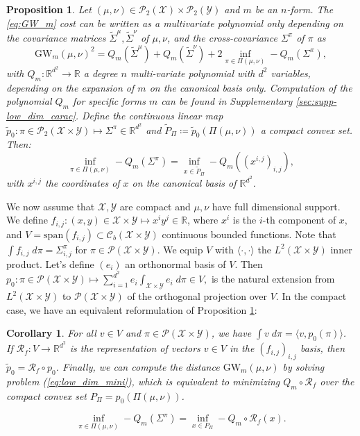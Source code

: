 \documentclass{article}
\newcommand{\R}{\mathbb{R}}
\newcommand{\Y}{\mathcal{Y}}
\newcommand{\X}{\mathcal{X}}
\newcommand{\1}{\mathbf{1}}
\newcommand{\GW}{\mathrm{GW}}
\renewcommand{\P}{\mathcal{P}}
\newtheorem{corollary}{Corollary}
\newtheorem{proposition}{Proposition}
\theoremstyle{definition}
\theoremstyle{remark}
\begin{document}
\begin{proposition}\label{proposition:GWm_problem} 
Let $(\mu,\nu)\in\P_2(\X)\times\P_2(\Y)$ and $m$ be an $n$-form. The \ref{eq:GW_m} cost can be written as a multivariate polynomial only depending on the covariance matrices $\tilde{\Sigma}^\mu,\tilde{\Sigma}^\nu$  of $\mu,\nu$, and the cross-covariance $\Sigma^{\pi}$ of $\pi$ as
\begin{equation*}
     \GW_m(\mu,\nu)^2= Q_m(\tilde{\Sigma}^\mu)+Q_m(\tilde{\Sigma}^\nu)+2\inf_{\pi\in \Pi(\mu,\nu)}-Q_m(\Sigma^{\pi}),
\end{equation*}
with $Q_m:\R^{d^2}\to \R$ a degree $n$ multi-variate polynomial with $d^2$ variables, depending on the expansion of $m$ on the canonical basis only. Computation of the polynomial $Q_m$ for specific forms $m$ can be found in Supplementary \ref{sec:supp-low_dim_carac}. Define the continuous linear map $\tilde{p}_0:\pi\in\P_2(\X\times\Y)\mapsto \Sigma^\pi\in\R^{d^2}$  and $\tilde{P}_\Pi\coloneqq \tilde{p}_0(\Pi(\mu,\nu))$ a compact convex set. Then:
\begin{equation}\label{eq:low_dim_mini}
    \inf_{\pi\in \Pi(\mu,\nu)}-Q_m(\Sigma^{\pi}) = \inf_{x\in \tilde{P}_\Pi} -Q_m((x^{i,j})_{i,j}),
\end{equation}
with $x^{i,j}$ the coordinates of $x$ on the canonical basis of $\R^{d^2}$.
\end{proposition}
We now assume that $\X,\Y$ are compact and $\mu,\nu$ have full dimensional support. We define $f_{i,j}:(x,y)\in\X\times\Y\mapsto x^iy^j\in \R$, where $x^i$ is the $i$-th component of $x$, and $V=\mathrm{span}(f_{i,j})\subset \mathcal{C}_b(\X\times\Y) $ continuous bounded functions. Note that $\int f_{i,j}\;d\pi=\Sigma^\pi_{i,j}$ for $\pi\in\P(\X\times\Y)$. We equip $V$ with $\langle\cdot,\cdot\rangle$ the $L^2(\X\times\Y)$ inner product. Let's define $(e_i)$ an orthonormal basis of $V$. Then $p_0:\pi\in\P(\X\times\Y)\mapsto \sum_{i=1}^{d^2}e_i\int_{\X\times\Y}e_i\;d\pi \in V,$ is the natural extension from $L^2(\X\times\Y)$ to $\P(\X\times\Y)$ of the orthogonal projection over $V$. In the compact case, we have an equivalent reformulation of Proposition \ref{proposition:GWm_problem}:
\begin{corollary}\label{coro:reformulation_GW_m}
    For all $v\in V$ and $\pi\in \P(\X\times\Y)$, we have $\int v\;d\pi=\langle v,p_0(\pi)\rangle$. If $\mathcal{R}_f:V\to\R^{d^2}$ is the representation of vectors $v\in V$ in the $(f_{i,j})_{i,j}$ basis, then $\tilde{p}_0= \mathcal{R}_f\circ p_0$. Finally, we can compute the distance $\GW_m(\mu,\nu)$ by solving problem (\ref{eq:low_dim_mini}), which is equivalent to minimizing $Q_m\circ \mathcal{R}_f$ over the compact convex set $P_\Pi=p_0(\Pi(\mu,\nu))$.

    \begin{equation*}
    \inf_{\pi\in \Pi(\mu,\nu)}-Q_m(\Sigma^{\pi}) = \inf_{x\in P_\Pi} -Q_m\circ\mathcal{R}_f(x).
\end{equation*}
\end{corollary}
\end{document}
